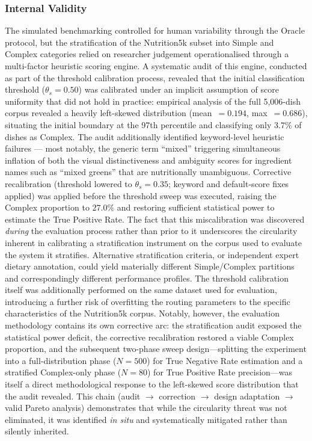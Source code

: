 \subsubsection{Internal Validity}
The simulated benchmarking controlled for human variability through the Oracle protocol, but the stratification of the Nutrition5k subset into Simple and Complex categories relied on researcher judgement operationalised through a multi-factor heuristic scoring engine. A systematic audit of this engine, conducted as part of the threshold calibration process, revealed that the initial classification threshold ($\theta_s = 0.50$) was calibrated under an implicit assumption of score uniformity that did not hold in practice: empirical analysis of the full 5,006-dish corpus revealed a heavily left-skewed distribution (mean~$= 0.194$, max~$= 0.686$), situating the initial boundary at the 97th percentile and classifying only $3.7\%$ of dishes as Complex. The audit additionally identified keyword-level heuristic failures --- most notably, the generic term ``mixed'' triggering simultaneous inflation of both the visual distinctiveness and ambiguity scores for ingredient names such as ``mixed greens'' that are nutritionally unambiguous. Corrective recalibration (threshold lowered to $\theta_s = 0.35$; keyword and default-score fixes applied) was applied before the threshold sweep was executed, raising the Complex proportion to $27.0\%$ and restoring sufficient statistical power to estimate the True Positive Rate. The fact that this miscalibration was discovered \emph{during} the evaluation process rather than prior to it underscores the circularity inherent in calibrating a stratification instrument on the corpus used to evaluate the system it stratifies. Alternative stratification criteria, or independent expert dietary annotation, could yield materially different Simple/Complex partitions and correspondingly different performance profiles. The threshold calibration itself was additionally performed on the same dataset used for evaluation, introducing a further risk of overfitting the routing parameters to the specific characteristics of the Nutrition5k corpus. Notably, however, the evaluation methodology contains its own corrective arc: the stratification audit exposed the statistical power deficit, the corrective recalibration restored a viable Complex proportion, and the subsequent two-phase sweep design---splitting the experiment into a full-distribution phase ($N=500$) for True Negative Rate estimation and a stratified Complex-only phase ($N=80$) for True Positive Rate precision---was itself a direct methodological response to the left-skewed score distribution that the audit revealed. This chain (audit $\rightarrow$ correction $\rightarrow$ design adaptation $\rightarrow$ valid Pareto analysis) demonstrates that while the circularity threat was not eliminated, it was identified \emph{in situ} and systematically mitigated rather than silently inherited.


